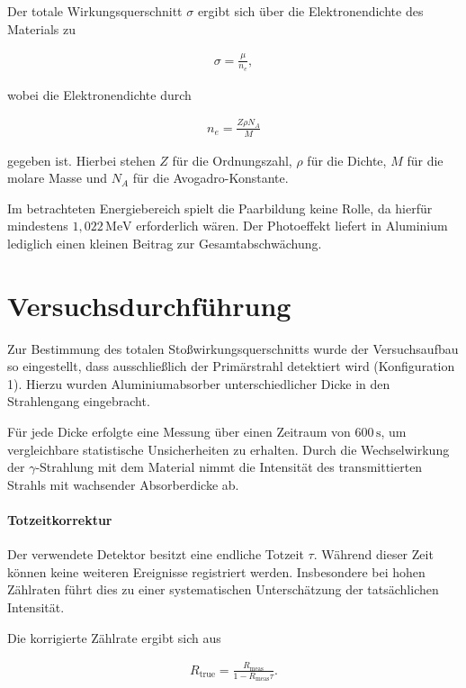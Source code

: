 Der totale Wirkungsquerschnitt $\sigma$ \cite{Knoll}\cite{Leo} ergibt sich über die Elektronendichte des Materials zu

\begin{align}
    \sigma = \frac{\mu}{n_e},
\end{align}

wobei die Elektronendichte \cite{Knoll}\cite{Leo} durch

\begin{align}
    n_e = \frac{Z \rho N_A}{M}
\end{align}

gegeben ist. 
Hierbei stehen $Z$ für die Ordnungszahl, $\rho$ für die Dichte, $M$ für die molare Masse und $N_A$ für die Avogadro-Konstante.

Im betrachteten Energiebereich spielt die Paarbildung keine Rolle, da hierfür mindestens $1{,}022\,\mathrm{MeV}$ erforderlich wären. 
Der Photoeffekt liefert in Aluminium lediglich einen kleinen Beitrag zur Gesamtabschwächung.

\section{Versuchsdurchführung}

Zur Bestimmung des totalen Stoßwirkungsquerschnitts wurde der Versuchsaufbau so eingestellt, dass ausschließlich der Primärstrahl detektiert wird (Konfiguration 1). 
Hierzu wurden Aluminiumabsorber unterschiedlicher Dicke in den Strahlengang eingebracht.

Für jede Dicke erfolgte eine Messung über einen Zeitraum von $600\,\mathrm{s}$, um vergleichbare statistische Unsicherheiten zu erhalten. 
Durch die Wechselwirkung der $\gamma$-Strahlung mit dem Material nimmt die Intensität des transmittierten Strahls mit wachsender Absorberdicke ab.

\paragraph{Totzeitkorrektur}

Der verwendete Detektor besitzt eine endliche Totzeit $\tau$. 
Während dieser Zeit können keine weiteren Ereignisse registriert werden. 
Insbesondere bei hohen Zählraten führt dies zu einer systematischen Unterschätzung der tatsächlichen Intensität.

Die korrigierte Zählrate ergibt sich aus

\begin{align}
    R_\mathrm{true}
    =
    \frac{R_\mathrm{meas}}
    {1-R_\mathrm{meas}\tau}.
\end{align}

